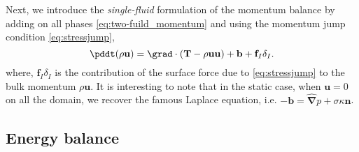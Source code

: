Next, we introduce the \textit{single-fluid} formulation of the momentum balance by adding on all phases \ref{eq:two-fuild_momentum} and using the momentum jump condition \ref{eq:stressjump}, 
\begin{equation}
   \pddt (\rho \textbf{u})
    = \grad \cdot (\textbf{T} -\rho  \textbf{u} \textbf{u})
    + \textbf{b}
    + \textbf{f}_I\delta_I.
    \label{eq:one-fuild_momentum}
\end{equation}
where, $\textbf{f}_I\delta_I$ is the contribution of the surface force due to \ref{eq:stressjump} to the bulk momentum $\rho \textbf{u}$. 
It is interesting to note that in the static case, when $\textbf{u}=0$ on all the domain, we recover the famous Laplace equation, i.e. $ -\bm{b} = \hat{\bm{\nabla}}p +\sigma \kappa \textbf{n} $.

\subsection{Energy balance}

